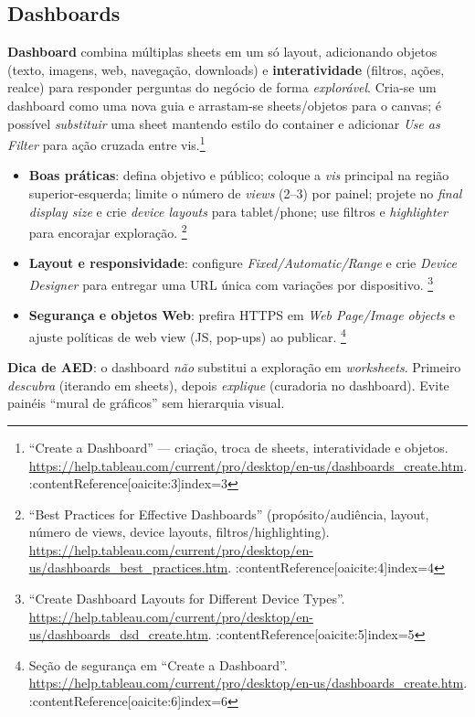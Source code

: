 \subsection{Dashboards}
\textbf{Dashboard} combina múltiplas sheets em um só layout, adicionando objetos (texto, imagens, web, navegação, downloads) e \textbf{interatividade} (filtros, ações, realce) para responder perguntas do negócio de forma \textit{explorável}. Cria-se um dashboard como uma nova guia e arrastam-se sheets/objetos para o canvas; é possível \textit{substituir} uma sheet mantendo estilo do container e adicionar \textit{Use as Filter} para ação cruzada entre vis.\footnote{``Create a Dashboard'' — criação, troca de sheets, interatividade e objetos. \url{https://help.tableau.com/current/pro/desktop/en-us/dashboards_create.htm}. :contentReference[oaicite:3]{index=3}}
\begin{itemize}[leftmargin=*]
  \item \textbf{Boas práticas}: defina objetivo e público; coloque a \textit{vis} principal na região superior-esquerda; limite o número de \textit{views} (2–3) por painel; projete no \textit{final display size} e crie \textit{device layouts} para tablet/phone; use filtros e \textit{highlighter} para encorajar exploração. \footnote{``Best Practices for Effective Dashboards'' (propósito/audiência, layout, número de views, device layouts, filtros/highlighting). \url{https://help.tableau.com/current/pro/desktop/en-us/dashboards_best_practices.htm}. :contentReference[oaicite:4]{index=4}}
  \item \textbf{Layout e responsividade}: configure \textit{Fixed/Automatic/Range} e crie \textit{Device Designer} para entregar uma URL única com variações por dispositivo. \footnote{``Create Dashboard Layouts for Different Device Types''. \url{https://help.tableau.com/current/pro/desktop/en-us/dashboards_dsd_create.htm}. :contentReference[oaicite:5]{index=5}}
  \item \textbf{Segurança e objetos Web}: prefira HTTPS em \textit{Web Page/Image objects} e ajuste políticas de web view (JS, pop-ups) ao publicar. \footnote{Seção de segurança em ``Create a Dashboard''. \url{https://help.tableau.com/current/pro/desktop/en-us/dashboards_create.htm}. :contentReference[oaicite:6]{index=6}}
\end{itemize}

\begin{NoteBox}
\textbf{Dica de AED}: o dashboard \textit{não} substitui a exploração em \textit{worksheets}. Primeiro \textit{descubra} (iterando em sheets), depois \textit{explique} (curadoria no dashboard). Evite painéis ``mural de gráficos'' sem hierarquia visual.
\end{NoteBox}

